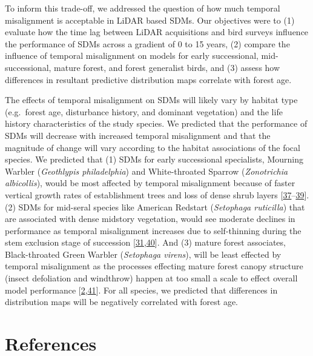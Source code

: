 \documentclass[manuscript, 3p, authoryear]{elsarticle} %
\begin{document}
To inform this trade-off, we addressed the question of how much temporal misalignment is acceptable in LiDAR based SDMs. Our objectives were to (1) evaluate how the time lag between LiDAR acquisitions and bird surveys influence the performance of SDMs across a gradient of 0 to 15 years, (2) compare the influence of temporal misalignment on models for early successional, mid-successional, mature forest, and forest generalist birds, and (3) assess how differences in resultant predictive distribution maps correlate with forest age.

The effects of temporal misalignment on SDMs will likely vary by habitat type (e.g.~forest age, disturbance history, and dominant vegetation) and the life history characteristics of the study species. We predicted that the performance of SDMs will decrease with increased temporal misalignment and that the magnitude of change will vary according to the habitat associations of the focal species. We predicted that (1) SDMs for early successional specialists, Mourning Warbler (\emph{Geothlypis philadelphia}) and White-throated Sparrow (\emph{Zonotrichia albicollis}), would be most affected by temporal misalignment because of faster vertical growth rates of establishment trees and loss of dense shrub layers {[}\protect\hyperlink{ref-mccarthy2001gap}{37}--\protect\hyperlink{ref-pitocchelliMourningWarblerGeothlypis2020}{39}{]}. (2) SDMs for mid-seral species like American Redstart (\emph{Setophaga ruticilla}) that are associated with dense midstory vegetation, would see moderate declines in performance as temporal misalignment increases due to self-thinning during the stem exclusion stage of succession {[}\protect\hyperlink{ref-brassardStandStructureComposition2010}{31},\protect\hyperlink{ref-sherryAmericanRedstartSetophaga2020a}{40}{]}. And (3) mature forest associates, Black-throated Green Warbler (\emph{Setophaga virens}), will be least effected by temporal misalignment as the processes effecting mature forest canopy structure (insect defoliation and windthrow) happen at too small a scale to effect overall model performance {[}\protect\hyperlink{ref-VierlingSwift2014}{2},\protect\hyperlink{ref-morseBlackthroatedGreenWarbler2020}{41}{]}. For all species, we predicted that differences in distribution maps will be negatively correlated with forest age.

\hypertarget{references}{%
\section*{References}\label{references}}
\end{document}
